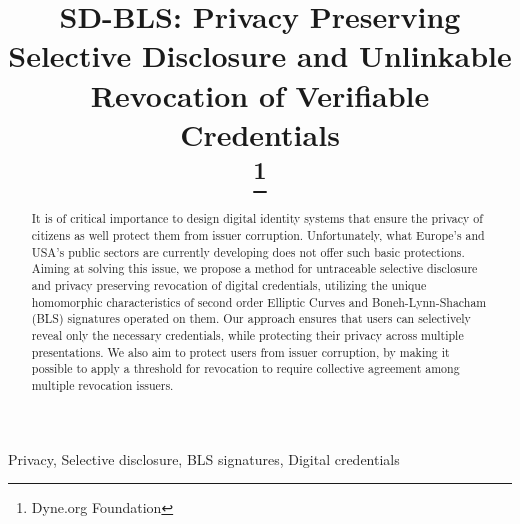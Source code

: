 \documentclass[conference]{IEEEtran}
\begin{document}
\title{SD-BLS: Privacy Preserving Selective Disclosure and Unlinkable Revocation of Verifiable Credentials\\
\thanks{Dyne.org Foundation}
}

\author{
\and
{}
\and
{}
}

\maketitle

\begin{abstract}

It is of critical importance to design digital identity systems that
ensure the privacy of citizens as well protect them from issuer
corruption. Unfortunately, what Europe's and USA's public sectors are
currently developing does not offer such basic protections. Aiming at
solving this issue, we propose a method for untraceable selective
disclosure and privacy preserving revocation of digital credentials,
utilizing the unique homomorphic characteristics of second order
Elliptic Curves and Boneh-Lynn-Shacham (BLS) signatures operated on
them. Our approach ensures that users can selectively reveal only the
necessary credentials, while protecting their privacy across multiple
presentations.  We also aim to protect users from issuer corruption,
by making it possible to apply a threshold for revocation to require
collective agreement among multiple revocation issuers.

\end{abstract}

\begin{IEEEkeywords}
Privacy, Selective disclosure, BLS signatures, Digital credentials
\end{IEEEkeywords}
\end{document}
